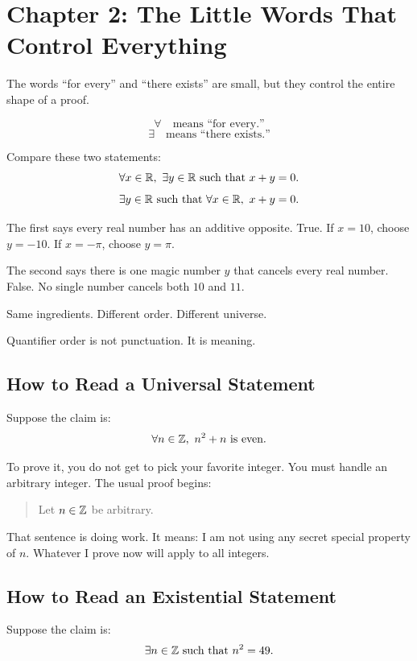 \documentclass[11pt]{article}
\begin{document}
\section{Chapter 2: The Little Words That Control Everything}

The words ``for every'' and ``there exists'' are small, but they control the entire shape of a proof.

\[
\forall \quad \text{means ``for every.''}
\]
\[
\exists \quad \text{means ``there exists.''}
\]

Compare these two statements:
\[
\forall x\in\mathbb{R},\ \exists y\in\mathbb{R} \text{ such that } x+y=0.
\]
\[
\exists y\in\mathbb{R} \text{ such that } \forall x\in\mathbb{R},\ x+y=0.
\]

The first says every real number has an additive opposite. True. If $x=10$, choose $y=-10$. If $x=-\pi$, choose $y=\pi$.

The second says there is one magic number $y$ that cancels every real number. False. No single number cancels both $10$ and $11$.

Same ingredients. Different order. Different universe.

\begin{focusbox}
Quantifier order is not punctuation. It is meaning.
\end{focusbox}

\subsection{How to Read a Universal Statement}

Suppose the claim is:
\[
\forall n\in\Z,\ n^2+n \text{ is even}.
\]

To prove it, you do not get to pick your favorite integer. You must handle an arbitrary integer. The usual proof begins:

\begin{quote}
Let $n\in\mathbb{Z}$ be arbitrary.
\end{quote}

That sentence is doing work. It means: I am not using any secret special property of $n$. Whatever I prove now will apply to all integers.

\subsection{How to Read an Existential Statement}

Suppose the claim is:
\[
\exists n\in\mathbb{Z} \text{ such that } n^2=49.
\]
\end{document}
